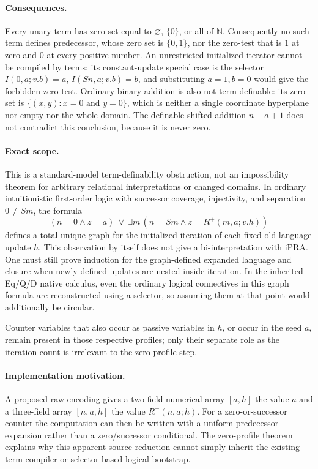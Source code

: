 \paragraph{Consequences.}
Every unary term has zero set equal to $\varnothing$, $\{0\}$, or all
of $\mathbb N$.  Consequently no such term defines predecessor, whose
zero set is $\{0,1\}$, nor the zero-test that is $1$ at zero and $0$
at every positive number.  An unrestricted initialized iterator cannot
be compiled by terms: its constant-update special case is the selector
$I(0,a;v.b)=a$, $I(Sn,a;v.b)=b$, and substituting $a=1,b=0$ would
give the forbidden zero-test.
Ordinary binary addition is also not term-definable: its zero set is
$\{(x,y):x=0\text{ and }y=0\}$, which is neither a single coordinate
hyperplane nor empty nor the whole domain.  The definable shifted addition
$n+a+1$ does not contradict this conclusion, because it is never zero.

\paragraph{Exact scope.}
This is a standard-model term-definability obstruction, not an
impossibility theorem for arbitrary relational interpretations or
changed domains.  In ordinary intuitionistic first-order logic with
successor coverage, injectivity, and separation $0\ne Sm$, the formula
\[
 (n=0\wedge z=a)\ \vee\
 \exists m\,(n=Sm\wedge z=R^+(m,a;v.h))
\]
defines a total unique graph for the initialized iteration of each
fixed old-language update $h$.  This observation by itself does not
give a bi-interpretation with iPRA.  One must still prove induction for
the graph-defined expanded language and closure when newly defined
updates are nested inside iteration.  In the inherited Eq/Q/D native
calculus, even the ordinary logical connectives in this graph formula
are reconstructed using a selector, so assuming them at that point
would additionally be circular.

Counter variables that also occur as passive variables in $h$, or occur
in the seed $a$, remain present in those respective profiles; only their
separate role as the iteration count is irrelevant to the zero-profile
step.

\paragraph{Implementation motivation.}
A proposed raw encoding gives a two-field numerical array $[a,h]$
the value $a$ and a three-field array $[n,a,h]$ the value
$R^+(n,a;h)$.  For a zero-or-successor counter the computation can then
be written with a uniform predecessor expansion rather than a
zero/successor conditional.  The zero-profile theorem explains why
this apparent source reduction cannot simply inherit the existing
term compiler or selector-based logical bootstrap.
